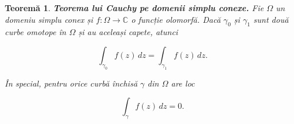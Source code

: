 \documentclass[12pt]{article}
\theoremstyle{definition}
\theoremstyle{plain}
\newtheorem{theorem}{Teoremă}
\begin{document}
\begin{theorem}
\textbf{Teorema lui Cauchy pe domenii simplu conexe.}  
Fie $\Omega$ un domeniu simplu conex și $f:\Omega \to \mathbb{C}$ o funcție olomorfă.  
Dacă $\gamma_0$ și $\gamma_1$ sunt două curbe omotope în $\Omega$ și au aceleași capete, atunci



\[
\int_{\gamma_0} f(z)\,dz = \int_{\gamma_1} f(z)\,dz.
\]



În special, pentru orice curbă închisă $\gamma$ din $\Omega$ are loc



\[
\int_{\gamma} f(z)\,dz = 0.
\]


\end{theorem}
\end{document}

